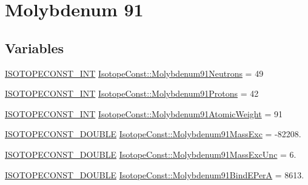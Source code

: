 \hypertarget{group___isotope_const-_molybdenum-_mo91}{}\section{Molybdenum 91}
\label{group___isotope_const-_molybdenum-_mo91}
\subsection*{Variables}
\begin{DoxyCompactItemize}
\item 
\mbox{\hyperlink{group___isotope_const-_macros_ga5f18360b3e99483a35c32d789e62621c}{I\+S\+O\+T\+O\+P\+E\+C\+O\+N\+S\+T\+\_\+\+I\+NT}} \mbox{\hyperlink{group___isotope_const-_molybdenum-_mo91_gad8dcc15a50a3d2041deb86aaa282c494}{Isotope\+Const\+::\+Molybdenum91\+Neutrons}} = 49
\item 
\mbox{\hyperlink{group___isotope_const-_macros_ga5f18360b3e99483a35c32d789e62621c}{I\+S\+O\+T\+O\+P\+E\+C\+O\+N\+S\+T\+\_\+\+I\+NT}} \mbox{\hyperlink{group___isotope_const-_molybdenum-_mo91_gaaa4704c1c6dfaf315bd4bdaf2c14371c}{Isotope\+Const\+::\+Molybdenum91\+Protons}} = 42
\item 
\mbox{\hyperlink{group___isotope_const-_macros_ga5f18360b3e99483a35c32d789e62621c}{I\+S\+O\+T\+O\+P\+E\+C\+O\+N\+S\+T\+\_\+\+I\+NT}} \mbox{\hyperlink{group___isotope_const-_molybdenum-_mo91_ga73b8805925cd888c44f09b76bb2c89c6}{Isotope\+Const\+::\+Molybdenum91\+Atomic\+Weight}} = 91
\item 
\mbox{\hyperlink{group___isotope_const-_macros_ga8f45a7272ce02c0b4c65c44636ed719a}{I\+S\+O\+T\+O\+P\+E\+C\+O\+N\+S\+T\+\_\+\+D\+O\+U\+B\+LE}} \mbox{\hyperlink{group___isotope_const-_molybdenum-_mo91_gad6be9e67b1df414d0fb1bd4842fbe063}{Isotope\+Const\+::\+Molybdenum91\+Mass\+Exc}} = -\/82208.
\item 
\mbox{\hyperlink{group___isotope_const-_macros_ga8f45a7272ce02c0b4c65c44636ed719a}{I\+S\+O\+T\+O\+P\+E\+C\+O\+N\+S\+T\+\_\+\+D\+O\+U\+B\+LE}} \mbox{\hyperlink{group___isotope_const-_molybdenum-_mo91_ga46001b10d8dbfb5dc527d756562904a1}{Isotope\+Const\+::\+Molybdenum91\+Mass\+Exc\+Unc}} = 6.
\item 
\mbox{\hyperlink{group___isotope_const-_macros_ga8f45a7272ce02c0b4c65c44636ed719a}{I\+S\+O\+T\+O\+P\+E\+C\+O\+N\+S\+T\+\_\+\+D\+O\+U\+B\+LE}} \mbox{\hyperlink{group___isotope_const-_molybdenum-_mo91_gae4c80ad55cefd817e6c57764b3e88a3d}{Isotope\+Const\+::\+Molybdenum91\+Bind\+E\+PerA}} = 8613.
\item 

\end{DoxyCompactItemize}
